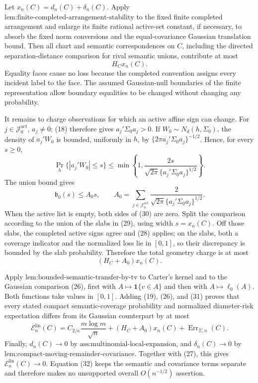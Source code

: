 Let \(x_n(C)=d_n(C)+\delta_n(C)\).  Apply \(\text{lem:finite-completed-arrangement-stability}\) to the fixed finite completed arrangement and enlarge its finite rational active-set constant, if necessary, to absorb the fixed norm conversions and the equal-covariance Gaussian translation bound.  Then all chart and semantic correspondences on \(C\), including the directed separation-distance comparison for rival semantic unions, contribute at most
\[
 H_Cx_n(C).
 \tag{28}
\]
Equality faces cause no loss because the completed convention assigns every incident label to the face.  The assumed Gaussian-null boundaries of the finite representation allow boundary equalities to be changed without changing any probability.

It remains to charge observations for which an active affine sign can change.  For \(j\in\mathcal J_0^{\mathrm{act}}\), \(a_j\ne0\); (18) therefore gives \(a_j'\Sigma_0a_j>0\).  If \(W_0\sim N_d(h,\Sigma_0)\), the density of \(a_j'W_0\) is bounded, uniformly in \(h\), by \(\{2\pi a_j'\Sigma_0a_j\}^{-1/2}\).  Hence, for every \(s\ge0\),
\[
 \Pr_h\{|a_j'W_0|\le s\}
 \le\min\left\{1,
 \frac{2s}{\sqrt{2\pi}\{a_j'\Sigma_0a_j\}^{1/2}}
 \right\}.
 \tag{29}
\]
The union bound gives
\[
 \mathfrak b_0(s)\le A_0s,
 \qquad
 A_0=\sum_{j\in\mathcal J_0^{\mathrm{act}}}
 \frac{2}{\sqrt{2\pi}\{a_j'\Sigma_0a_j\}^{1/2}}.
 \tag{30}
\]
When the active list is empty, both sides of (30) are zero.  Split the comparison according to the union of the slabs in (29), using width \(s=x_n(C)\).  Off those slabs, the completed active signs agree and (28) applies; on the slabs, both a coverage indicator and the normalized loss lie in \([0,1]\), so their discrepancy is bounded by the slab probability.  Therefore the total geometry charge is at most
\[
 (H_C+A_0)x_n(C).
 \tag{31}
\]

Apply \(\text{lem:bounded-semantic-transfer-by-tv}\) to Carter's kernel and to the Gaussian comparison (26), first with \(A\mapsto\mathbf1\{v\in A\}\) and then with \(A\mapsto\ell_0(A)\).  Both functions take values in \([0,1]\).  Adding (19), (26), and (31) proves that every stated compact semantic-coverage probability and normalized diameter-risk expectation differs from its Gaussian counterpart by at most
\[
 \mathcal E_n^{\mathrm{lin}}(C)
 =C_{2/\kappa}\frac{m\log m}{\sqrt n}
 +(H_C+A_0)x_n(C)+\operatorname{Err}_{\Sigma,n}(C).
 \tag{32}
\]
Finally, \(d_n(C)\to0\) by \(\text{ass:multinomial-local-expansion}\), and \(\delta_n(C)\to0\) by \(\text{lem:compact-moving-remainder-covariance}\).  Together with (27), this gives \(\mathcal E_n^{\mathrm{lin}}(C)\to0\).  Equation (32) keeps the semantic and covariance terms separate and therefore makes no unsupported overall \(O(n^{-1/2})\) assertion.


